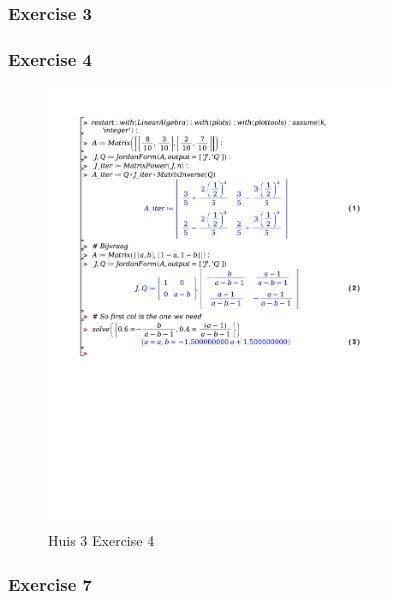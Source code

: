 \documentclass[a4paper]{report}
\begin{document}
\subsubsection{Exercise 3}



\subsubsection{Exercise 4}

\begin{figure}[H]
	\centering
	\includegraphics[width=0.8\textwidth]{exercises/huis_3_ex_4.pdf}
	\caption{Huis 3 Exercise 4}
	\label{fig:huis_3_ex_4_Maple}
\end{figure}



\subsubsection{Exercise 7}
\end{document}
